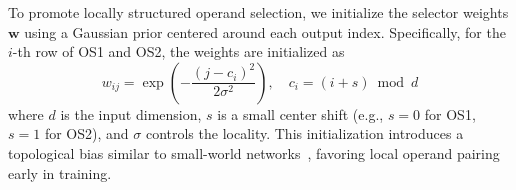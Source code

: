 To promote locally structured operand selection, we initialize the selector weights $\mathbf{w}$ using a Gaussian prior centered around each output index. Specifically, for the $i$-th row of OS1 and OS2, the weights are initialized as
\[
w_{ij} = \exp\left( -\frac{(j - c_i)^2}{2\sigma^2} \right), \quad c_i = (i + s) \bmod d
\]
where $d$ is the input dimension, $s$ is a small center shift (e.g., $s=0$ for OS1, $s=1$ for OS2), and $\sigma$ controls the locality. This initialization introduces a topological bias similar to small-world networks~\cite{watts1998collective}, favoring local operand pairing early in training.
